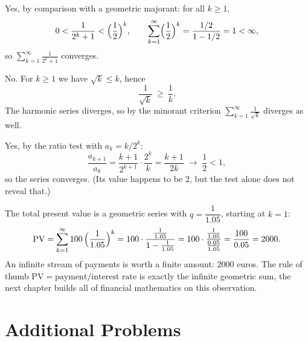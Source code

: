 \begin{solutions}
  \item Yes, by comparison with a geometric majorant: for all $k\ge 1$,
        \[
          0<\frac{1}{2^{k}+1}<\Bigl(\frac12\Bigr)^{k},
          \qquad
          \sum_{k=1}^{\infty}\Bigl(\frac12\Bigr)^{k}
          =\frac{1/2}{1-1/2}=1<\infty ,
        \]
        so $\displaystyle\sum_{k=1}^{\infty}\frac{1}{2^{k}+1}$ converges.

  \item No. For $k\ge 1$ we have $\sqrt{k}\le k$, hence
        \[
          \frac{1}{\sqrt{k}}\ \ge\ \frac{1}{k} .
        \]
        The harmonic series diverges, so by the minorant criterion
        $\displaystyle\sum_{k=1}^{\infty}\frac{1}{\sqrt{k}}$ diverges as
        well.

  \item Yes, by the ratio test with $a_k=k/2^{k}$:
        \[
          \frac{a_{k+1}}{a_k}
          =\frac{k+1}{2^{k+1}}\cdot\frac{2^{k}}{k}
          =\frac{k+1}{2k}
          \;\longrightarrow\;\frac12<1 ,
        \]
        so the series converges. (Its value happens to be $2$, but the
        test alone does not reveal that.)

  \item The total present value is a geometric series with
        $q=\dfrac{1}{1.05}$, starting at $k=1$:
        \[
          \mathrm{PV}
          =\sum_{k=1}^{\infty}100\,\Bigl(\frac{1}{1.05}\Bigr)^{k}
          =100\cdot\frac{\tfrac{1}{1.05}}{1-\tfrac{1}{1.05}}
          =100\cdot\frac{\tfrac{1}{1.05}}{\tfrac{0.05}{1.05}}
          =\frac{100}{0.05}=2000 .
        \]
        An infinite stream of payments is worth a finite amount:
        $2000$ euros. The rule of thumb
        $\mathrm{PV}=\text{payment}/\text{interest rate}$ is exactly the
        infinite geometric sum, the next chapter builds all of financial
        mathematics on this observation.
\end{solutions}

\section{Additional Problems}

